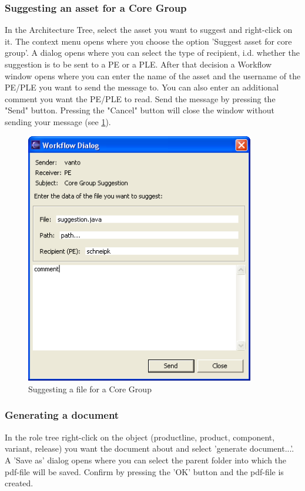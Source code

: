 \subsubsection{Suggesting an asset for a Core Group}

In the Architecture Tree, select the asset you want to suggest and right-click on it. The context menu opens where
 you choose the option 'Suggest asset for core group'. A dialog opens where
 you can select the type of recipient, i.d. whether the suggestion is to be sent to a PE or a PLE. After
 that decision a Workflow
window opens where you can enter the name of the asset and the username of the
PE/PLE you want to send the message to. You can also enter an additional comment you want 
the PE/PLE to read. Send the message by pressing the "Send" 
button. Pressing the "Cancel" button will close the window without sending 
your message (see \ref{core1}).

\begin{figure}[h!]
\begin{center}
\includegraphics[width=10cm]{core1.png}
   \caption{Suggesting a file for a Core Group}
\label{core1}
\end{center}
\end{figure}\par


\subsubsection{Generating a document}
In the role tree right-click on the object (productline, product, component, variant, release) you want the document about
and select 'generate document...'. A 'Save as' dialog opens where you can select the parent folder into which the pdf-file
will be saved. Confirm by pressing the 'OK' button and the pdf-file is created.

